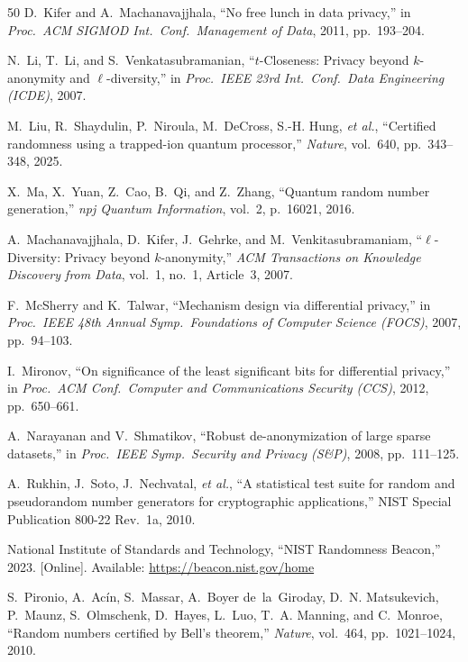 \documentclass[journal]{IEEEtran}
\begin{document}
\begin{thebibliography}{50}
D.~Kifer and A.~Machanavajjhala, ``No free lunch in data privacy,'' in \emph{Proc.\ ACM SIGMOD Int.\ Conf.\ Management of Data}, 2011, pp.~193--204.

N.~Li, T.~Li, and S.~Venkatasubramanian, ``$t$-Closeness: Privacy beyond $k$-anonymity and $\ell$-diversity,'' in \emph{Proc.\ IEEE 23rd Int.\ Conf.\ Data Engineering (ICDE)}, 2007.

M.~Liu, R.~Shaydulin, P.~Niroula, M.~DeCross, S.-H. Hung, \emph{et al.}, ``Certified randomness using a trapped-ion quantum processor,'' \emph{Nature}, vol.~640, pp.~343--348, 2025.

X.~Ma, X.~Yuan, Z.~Cao, B.~Qi, and Z.~Zhang, ``Quantum random number generation,'' \emph{npj Quantum Information}, vol.~2, p.~16021, 2016.

A.~Machanavajjhala, D.~Kifer, J.~Gehrke, and M.~Venkitasubramaniam, ``$\ell$-Diversity: Privacy beyond $k$-anonymity,'' \emph{ACM Transactions on Knowledge Discovery from Data}, vol.~1, no.~1, Article~3, 2007.

F.~McSherry and K.~Talwar, ``Mechanism design via differential privacy,'' in \emph{Proc.\ IEEE 48th Annual Symp.\ Foundations of Computer Science (FOCS)}, 2007, pp.~94--103.

I.~Mironov, ``On significance of the least significant bits for differential privacy,'' in \emph{Proc.\ ACM Conf.\ Computer and Communications Security (CCS)}, 2012, pp.~650--661.

A.~Narayanan and V.~Shmatikov, ``Robust de-anonymization of large sparse datasets,'' in \emph{Proc.\ IEEE Symp.\ Security and Privacy (S\&P)}, 2008, pp.~111--125.

A.~Rukhin, J.~Soto, J.~Nechvatal, \emph{et al.}, ``A statistical test suite for random and pseudorandom number generators for cryptographic applications,'' NIST Special Publication 800-22 Rev.~1a, 2010.

{National Institute of Standards and Technology}, ``NIST Randomness Beacon,'' 2023. [Online]. Available: \url{https://beacon.nist.gov/home}

S.~Pironio, A.~Ac\'{i}n, S.~Massar, A.~Boyer de~la~Giroday, D.~N. Matsukevich, P.~Maunz, S.~Olmschenk, D.~Hayes, L.~Luo, T.~A. Manning, and C.~Monroe, ``Random numbers certified by Bell's theorem,'' \emph{Nature}, vol.~464, pp.~1021--1024, 2010.


\end{thebibliography}
\end{document}
